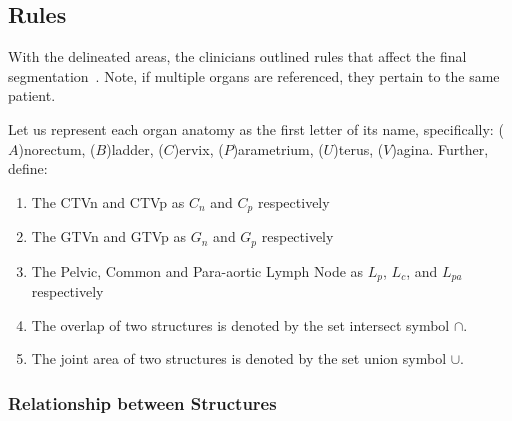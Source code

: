 \documentclass[11pt,twoside]{report}
\begin{document}
\subsection{Rules}\label{sec:rules}

With the delineated areas, the clinicians outlined rules that affect the final segmentation~\cite{AMLART-data}. Note, if multiple organs are referenced, they pertain to the same patient.

Let us represent each organ anatomy as the first letter of its name, specifically: ($A$)norectum, ($B$)ladder, ($C$)ervix, ($P$)arametrium, ($U$)terus, ($V$)agina. Further, define:

\begin{enumerate}
  \item The CTVn and CTVp as $C_n$ and $C_p$ respectively
  \item The GTVn and GTVp as $G_n$ and $G_p$ respectively
  \item The Pelvic, Common and Para-aortic Lymph Node as $L_p$, $L_c$, and $L_{pa}$ respectively  
  \item The overlap of two structures is denoted by the set intersect symbol $\cap$.
  \item The joint area of two structures is denoted by the set union symbol $\cup$.
\end{enumerate}

\subsubsection{Relationship between Structures}
\end{document}
